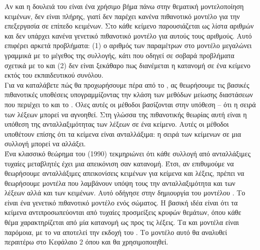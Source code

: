 Αν και η δουλειά του {} είναι ένα χρήσιμο βήμα πάνω στην θεματική
μοντελοποίηση κειμένων, δεν είναι πλήρης, γιατί δεν παρέχει κανένα πιθανοτικό μοντέλο
για την επεξεργασία σε επίπεδο κειμένων. Στο {} κάθε κείμενο παρουσιάζεται ως λίστα
αριθμών και δεν υπάρχει κανένα γενετικό πιθανοτικό μοντέλο για αυτούς τους αριθμούς.
Αυτό επιφέρει αρκετά προβλήματα: (1) ο αριθμός των παραμέτρων στο μοντέλο μεγαλώνει
γραμμικά με το μέγεθος της συλλογής, κάτι που οδηγεί σε σοβαρά προβλήματα σχετικά με
το {} και (2) δεν είναι ξεκάθαρο πως διανέμεται η κατανομή σε ένα κείμενο εκτός
του εκπαιδευτικού συνόλου. \\

Για να καταλάβετε πώς θα προχωρήσουμε πέρα από το {}, ας θεωρήσουμε τις βασικές
πιθανοτικές υποθέσεις υπογραμμίζοντας την κλάση των μεθόδων μείωσης διαστάσεων που
περιέχει το {} και το {}. 
Όλες αυτές οι μέθοδοι βασίζονται στην \textit{{}} υπόθεση – ότι η σειρά των λέξεων μπορεί να αγνοηθεί. 
Στη γλώσσα της πιθανοτικής θεωρίας αυτή είναι η υπόθεση της ανταλλαξιμότητας των λέξεων σε ένα κείμενο. 
Αυτές οι μέθοδοι υποθέτουν επίσης ότι τα κείμενα είναι ανταλλάξιμα: 
η σειρά των κείμενων σε μια συλλογή μπορεί να αλλάξει. \\

Ένα κλασσικό θεώρημα του {} (1990) τεκμηριώνει ότι κάθε συλλογή από ανταλλάξιμες τυχαίες μεταβλητές 
έχει μια απεικόνιση σαν {} κατανομή. 
Έτσι, αν επιθυμούμε να θεωρήσουμε ανταλλάξιμες απεικονίσεις κειμένων για κείμενα και λέξεις,
πρέπει να θεωρήσουμε {} μοντέλα που λαμβάνουν υπόψη τους την ανταλλαξιμότητα και των λέξεων αλλά και των κειμένων. 
Αυτό οδήγησε στην δημιουργία του μοντέλου \textbf{{}}. 
Το {} είναι ένα γενετικό πιθανοτικό μοντέλο ενός σώματος. 
Η βασική ιδέα είναι ότι τα κείμενα αντιπροσωπεύονται από τυχαίες προσμείξεις κρυφών θεμάτων, 
όπου κάθε θέμα χαρακτηρίζεται από μία κατανομή ως προς τις λέξεις. 
Τα {} και {} μοντέλα είναι παρόμοια, με το {} να αποτελεί την \textit{{}} εκδοχή του {}.
Το μοντέλο αυτό θα αναλυθεί περαιτέρω στο Κεφάλαιο 2 όπου και θα χρησιμοποιηθεί. 
